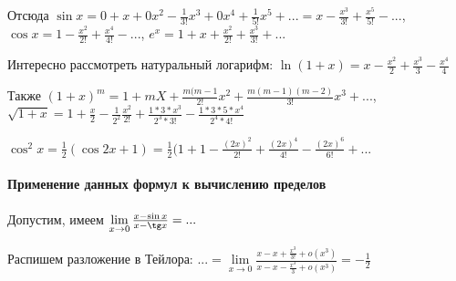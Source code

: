 \documentclass{article}
\begin{document}
\begin{flushleft}
Отсюда $\sin x = 0 + x + 0x^2 - \frac{1}{3!}x^3 + 0x^4 + \frac{1}{5!}x^5 + ... = x - \frac{x^3}{3!} + \frac{x^5}{5!} - ...$, $\cos x = 1 - \frac{x^2}{2!} + \frac{x^4}{4!} - ...$, $e^{x} = 1 + x + \frac{x^2}{2!} + \frac{x^3}{3!} + ...$

Интересно рассмотреть натуральный логарифм: $\ln (1 + x) = x - \frac{x^2}{2} + \frac{x^3}{3} - \frac{x^4}{4}$

Также $(1 + x)^m = 1 + m X + \frac{m(m - 1}{2!}x^2 + \frac{m(m - 1)(m - 2)}{3!}x^3 + ...$, $\sqrt{1 + x} = 1 + \frac{x}{2} - \frac{1}{2^2} \frac{x^2}{2!} + \frac{1 * 3 * x^3}{2^3 * 3!} - \frac{1 * 3 * 5 * x^4}{2^4 * 4!}$

$\cos^2 x = \frac{1}{2} (\cos 2x + 1) = \frac{1}{2} (1 + 1 - \frac{(2x)^2}{2!} + \frac{(2x)^4}{4!} - \frac{(2x)^6}{6!} + ...$

\paragraph{Применение данных формул к вычислению пределов}

Допустим, имеем $\lim\limits_{x \to 0} \frac{x - \sin x}{x - \tg x} = ...$

Распишем разложение в Тейлора: $... = \lim\limits_{x \to 0} \frac{x - x + \frac{x^3}{3!} + o(x^3)}{x - x - \frac{x^3}{3} + o(x^3)} = -\frac{1}{2}$

\end{flushleft}
\end{document}
